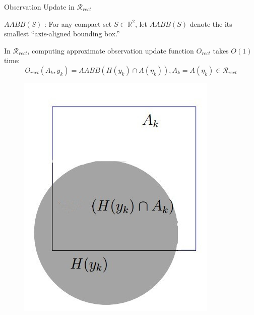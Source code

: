 \documentclass[10pt]{beamer}
\begin{document}
\begin{frame}{Observation Update in $\mathcal{R}_{rect}$}
\begin{definition}{\textbf{$AABB(S)$} :}
    For any compact set $S \subset \mathbb{R}^2$, let $AABB(S)$
	denote the its smallest	``axis-aligned bounding box.''
\end{definition}

In $\mathcal{R}_{rect}$, computing approximate observation update function $O_{rect}$ takes $O(1)$ time:\\
$$ O_{rect}(A_k, y_k) = AABB(H(y_k) \cap A(\eta_k)), A_k = A(\eta_k) \in \mathcal{R}_{rect}$$

\begin{figure}
    \includegraphics[scale=0.27]{figs/circlerect_1.jpg}
    \end{figure}
 
\end{frame}
\end{document}
